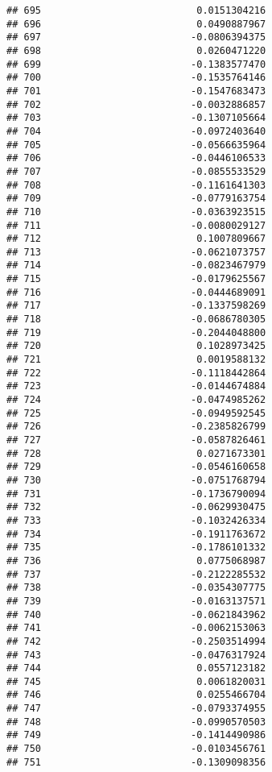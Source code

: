 \documentclass[
]{article}
\begin{document}
\begin{verbatim}
## 695                           0.0151304216
## 696                           0.0490887967
## 697                          -0.0806394375
## 698                           0.0260471220
## 699                          -0.1383577470
## 700                          -0.1535764146
## 701                          -0.1547683473
## 702                          -0.0032886857
## 703                          -0.1307105664
## 704                          -0.0972403640
## 705                          -0.0566635964
## 706                          -0.0446106533
## 707                          -0.0855533529
## 708                          -0.1161641303
## 709                          -0.0779163754
## 710                          -0.0363923515
## 711                          -0.0080029127
## 712                           0.1007809667
## 713                          -0.0621073757
## 714                          -0.0823467979
## 715                          -0.0179625567
## 716                          -0.0444689091
## 717                          -0.1337598269
## 718                          -0.0686780305
## 719                          -0.2044048800
## 720                           0.1028973425
## 721                           0.0019588132
## 722                          -0.1118442864
## 723                          -0.0144674884
## 724                          -0.0474985262
## 725                          -0.0949592545
## 726                          -0.2385826799
## 727                          -0.0587826461
## 728                           0.0271673301
## 729                          -0.0546160658
## 730                          -0.0751768794
## 731                          -0.1736790094
## 732                          -0.0629930475
## 733                          -0.1032426334
## 734                          -0.1911763672
## 735                          -0.1786101332
## 736                           0.0775068987
## 737                          -0.2122285532
## 738                          -0.0354307775
## 739                          -0.0163137571
## 740                          -0.0621843962
## 741                          -0.0062153063
## 742                          -0.2503514994
## 743                          -0.0476317924
## 744                           0.0557123182
## 745                           0.0061820031
## 746                           0.0255466704
## 747                          -0.0793374955
## 748                          -0.0990570503
## 749                          -0.1414490986
## 750                          -0.0103456761
## 751                          -0.1309098356

\end{verbatim}
\end{document}
